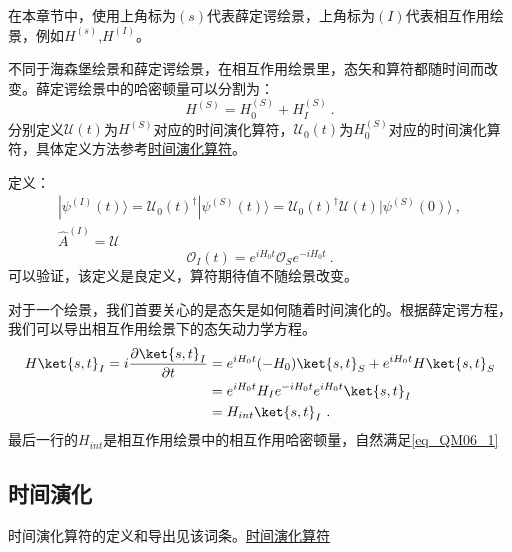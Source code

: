 
在本章节中，使用上角标为$(s)$代表薛定谔绘景，上角标为$(I)$代表相互作用绘景，例如$H^{(s)}$,$H^{(I)}$。

\begin{definition}{}

不同于海森堡绘景和薛定谔绘景，在相互作用绘景里，态矢和算符都随时间而改变。薛定谔绘景中的哈密顿量可以分割为：
\begin{equation}
H^{(S)}=H^{(S)}_0+H^{(S)}_I~.
\end{equation}
分别定义$\mathcal U(t)$为$H^{(S)}$对应的时间演化算符，$\mathcal U_0(t)$为$H^{(S)}_0$对应的时间演化算符，具体定义方法参考\href{https://wuli.wiki/online/TOprt.html}{时间演化算符}。

定义：
\begin{align}
|\psi^{(I)}(t)\rangle=\mathcal U_0(t)^\dagger|\psi^{(S)}(t)\rangle=\mathcal U_0(t)^\dagger\mathcal U(t)|\psi^{(S)}(0)\rangle~, \\
\hat A^{(I)}=\mathcal U
\end{align}
\begin{equation}\label{eq_QM06_1}
\mathcal O_I(t)=e^{iH_0 t}\mathcal O_Se^{-iH_0 t}~.
\end{equation}
可以验证，该定义是良定义，算符期待值不随绘景改变。
\end{definition}
对于一个绘景，我们首要关心的是态矢是如何随着时间演化的。根据薛定谔方程，我们可以导出相互作用绘景下的态矢动力学方程。
\begin{equation}
\begin{aligned}
H\ket{s,t}_I=i\frac{\partial\ket{s,t}_I}{\partial t}&= e^{iH_0 t}(-H_0)\ket{s,t}_S+e^{iH_0 t}H\ket{s,t}_S\\
&=e^{iH_0 t}H_Ie^{-iH_0 t}e^{iH_0 t}\ket{s,t}_I\\
&=H_{int}\ket{s,t}_I~.
\end{aligned}
\end{equation}
最后一行的$H_{int}$是相互作用绘景中的相互作用哈密顿量，自然满足\autoref{eq_QM06_1} 
\subsection{时间演化}
时间演化算符的定义和导出见该词条。\href{https://wuli.wiki/online/TOprt.html}{时间演化算符}


